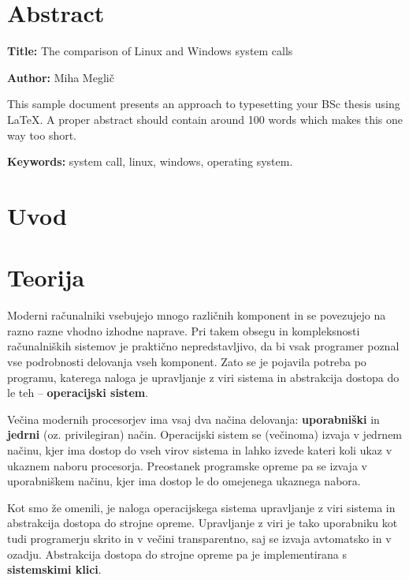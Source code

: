 \documentclass[a4paper,12pt,openright]{book}
\newcommand{\ttitleEn}{The comparison of Linux and Windows system calls}
\newcommand{\tauthor}{Miha Meglič}
\newcommand{\tkeywordsEn}{system call, linux, windows, operating system}
\newcommand{\clearemptydoublepage}{\newpage{\pagestyle{empty}\cleardoublepage}}
\begin{document}
\chapter*{Abstract}

\noindent\textbf{Title:} \ttitleEn
\bigskip

\noindent\textbf{Author:} \tauthor
\bigskip

\noindent This sample document presents an approach to typesetting your BSc thesis using \LaTeX. 
A proper abstract should contain around 100 words which makes this one way too short.
\bigskip

\noindent\textbf{Keywords:} \tkeywordsEn.
\clearemptydoublepage

\mainmatter
\setcounter{page}{1}
\pagestyle{fancy}

\chapter{Uvod}


\chapter{Teorija}

Moderni računalniki vsebujejo mnogo različnih komponent in se povezujejo na razno razne vhodno izhodne naprave.
Pri takem obsegu in kompleksnosti računalniških sistemov je praktično nepredstavljivo, da bi vsak programer poznal vse podrobnosti delovanja vseh komponent.
Zato se je pojavila potreba po programu, katerega naloga je upravljanje z viri sistema in abstrakcija dostopa do le teh -- \textbf{operacijski sistem}.

Večina modernih procesorjev ima vsaj dva načina delovanja: \textbf{uporabniški} in \textbf{jedrni} (oz. privilegiran) način.
Operacijski sistem se (večinoma) izvaja v jedrnem načinu, kjer ima dostop do vseh virov sistema in lahko izvede kateri koli ukaz v ukaznem naboru procesorja.
Preostanek programske opreme pa se izvaja v uporabniškem načinu, kjer ima dostop le do omejenega ukaznega nabora.

Kot smo že omenili, je naloga operacijskega sistema upravljanje z viri sistema in abstrakcija dostopa do strojne opreme.
Upravljanje z viri je tako uporabniku kot tudi programerju skrito in v večini transparentno, saj se izvaja avtomatsko in v ozadju.
Abstrakcija dostopa do strojne opreme pa je implementirana s \textbf{sistemskimi klici}.
\cite{Tanenbaum_Bos_2023}
\end{document}
